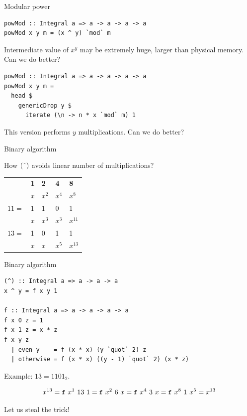 \documentclass[handout]{beamer}
\begin{document}
\begin{frame}[fragile]{Modular power}

\begin{lstlisting}
powMod :: Integral a => a -> a -> a -> a
powMod x y m = (x ^ y) `mod` m
\end{lstlisting}

Intermediate value of $x^y$ may be extremely huge, larger than physical memory. Can we do better?

\begin{lstlisting}
powMod :: Integral a => a -> a -> a -> a
powMod x y m =
  head $
    genericDrop y $
      iterate (\n -> n * x `mod` m) 1
\end{lstlisting}

This version performs $y$ multiplications. Can we do better?

\end{frame}

\begin{frame}{Binary algorithm}

How $(\string^)$ avoids linear number of multiplications?

\begin{table}
\begin{tabular}{lllll}
& {\bf 1} & {\bf 2} & {\bf 4} & {\bf 8} \\
& $x$ & $x^2$ & $x^4$ & $x^8$ \\\hline
$11 ={}$ & 1 & 1 & 0 & 1 \\
& $x$ & $x^3$ & $x^3$ & $x^{11}$ \\\hline
$13 ={}$ & 1 & 0 & 1 & 1 \\
& $x$ & $x$ & $x^5$ & $x^{13}$
\end{tabular}
\end{table}

\end{frame}

\begin{frame}[fragile]{Binary algorithm}

\begin{lstlisting}
(^) :: Integral a => a -> a -> a
x ^ y = f x y 1

f :: Integral a => a -> a -> a -> a
f x 0 z = 1
f x 1 z = x * z
f x y z
  | even y    = f (x * x) (y `quot` 2) z
  | otherwise = f (x * x) ((y - 1) `quot` 2) (x * z)
\end{lstlisting}

Example:
$13 = 1101_2$.

$$
x^{13} = {\tt f}~x^1~13~1 = {\tt f}~x^2~6~x = {\tt f}~x^4~3~x
      = {\tt f}~x^8~1~x^5 = x^{13}
$$

Let us steal the trick!

\end{frame}
\end{document}
